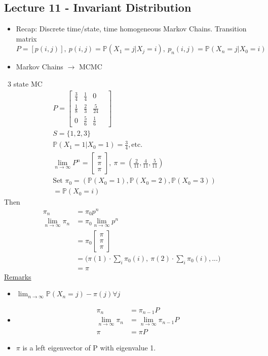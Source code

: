 \documentclass[12pt, letterpaper]{article}
\begin{document}
\subsection{Lecture 11 - Invariant Distribution}
\begin{itemize}
    \item Recap: Discrete time/state, time homogeneous Markov Chains. Transition matrix $P = [p(i,j)],\ p(i,j) = \mathbb{P}(X_1 = j | X_j = i),\ p_n(i,j) = \mathbb{P}(X_n=j | X_0 = i)$
    \item Markov Chains $\rightarrow$ MCMC 
\end{itemize}
\ 3 state MC
\begin{align*}
    &P = \begin{bmatrix}
        \frac 34 & \frac 14 & 0 \\
        \frac 18 & \frac 23 & \frac 5{24} \\
        0 & \frac 56 & \frac 16
    &\end{bmatrix} \\
    &S = \{1,2,3\} \\
    &\mathbb{P}(X_1=1|X_0=1) = \frac 34, \text{etc.} \\
    &\lim_{n\rightarrow \infty}P^n = \begin{bmatrix}
        \pi \\ \pi \\ \pi
    \end{bmatrix},\ \pi = (\frac 2{11}, \frac 4{11}, \frac 5{11}) \\
    & \text{Set } \pi_0 = (\mathbb{P}(X_0 =1), \mathbb{P}(X_0 =2), \mathbb{P}(X_0 =3)) \\
    & = \mathbb{P}(X_0 = i)
\end{align*}
Then 
\begin{align*}
    \pi_n &= \pi_0 p^n \\
    \lim_{n\rightarrow\infty} \pi_n &= \pi_0 \lim_{n\rightarrow \infty}p^n \\
    &= \pi_0 \begin{bmatrix}
        \pi \\ \pi \\ \pi
    \end{bmatrix} \\
    &= \Big(\pi(1) \cdot \sum_{i} \pi_0 (i),\ \pi(2) \cdot \sum_{i} \pi_0 (i), ... \Big) \\
    &= \pi
\end{align*}
\underline{Remarks}
\begin{itemize}
    \item $\lim_{n\rightarrow \infty} \mathbb{P} (X_n = j) - \pi(j) \forall j$
    \item \begin{align*}
        \pi_n &= \pi_{n-1}P \\
        \lim_{n\rightarrow\infty} \pi_n &= \lim_{n\rightarrow\infty}\pi_{n-1}P \\
        \pi &= \pi P
    \end{align*}
    \item $\pi$ is a left eigenvector of P with eigenvalue 1.
\end{itemize}
\end{document}
